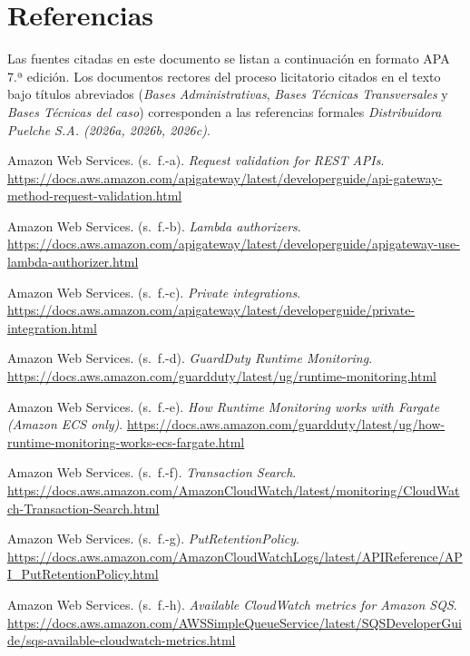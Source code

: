 \chapter*{Referencias}

Las fuentes citadas en este documento se listan a continuación en formato APA 7.ª edición. Los documentos rectores del proceso licitatorio citados en el texto bajo títulos abreviados (\textit{Bases Administrativas}, \textit{Bases Técnicas Transversales} y \textit{Bases Técnicas del caso}) corresponden a las referencias formales \textit{Distribuidora Puelche S.A. (2026a, 2026b, 2026c)}.

\begin{list}{}{\setlength{\leftmargin}{1.27cm}\setlength{\itemindent}{-1.27cm}\setlength{\itemsep}{0.5\baselineskip}\raggedright}
\item Amazon Web Services. (s.~f.-a). \textit{Request validation for REST APIs}. \url{https://docs.aws.amazon.com/apigateway/latest/developerguide/api-gateway-method-request-validation.html}
\item Amazon Web Services. (s.~f.-b). \textit{Lambda authorizers}. \url{https://docs.aws.amazon.com/apigateway/latest/developerguide/apigateway-use-lambda-authorizer.html}
\item Amazon Web Services. (s.~f.-c). \textit{Private integrations}. \url{https://docs.aws.amazon.com/apigateway/latest/developerguide/private-integration.html}
\item Amazon Web Services. (s.~f.-d). \textit{GuardDuty Runtime Monitoring}. \url{https://docs.aws.amazon.com/guardduty/latest/ug/runtime-monitoring.html}
\item Amazon Web Services. (s.~f.-e). \textit{How Runtime Monitoring works with Fargate (Amazon ECS only)}. \url{https://docs.aws.amazon.com/guardduty/latest/ug/how-runtime-monitoring-works-ecs-fargate.html}
\item Amazon Web Services. (s.~f.-f). \textit{Transaction Search}. \url{https://docs.aws.amazon.com/AmazonCloudWatch/latest/monitoring/CloudWatch-Transaction-Search.html}
\item Amazon Web Services. (s.~f.-g). \textit{PutRetentionPolicy}. \url{https://docs.aws.amazon.com/AmazonCloudWatchLogs/latest/APIReference/API_PutRetentionPolicy.html}
\item Amazon Web Services. (s.~f.-h). \textit{Available CloudWatch metrics for Amazon SQS}. \url{https://docs.aws.amazon.com/AWSSimpleQueueService/latest/SQSDeveloperGuide/sqs-available-cloudwatch-metrics.html}

\end{list}
